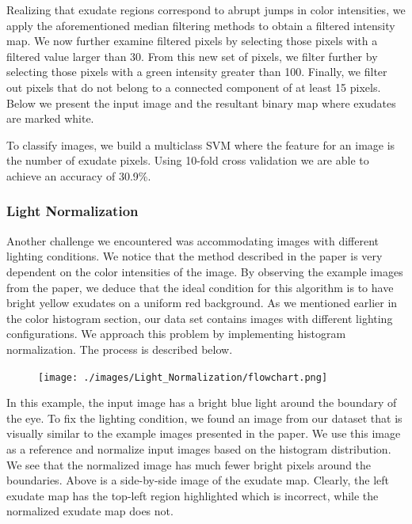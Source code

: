 \documentclass{article} %
\begin{document}
Realizing that exudate regions correspond to abrupt jumps in color intensities, we apply the aforementioned median filtering methods to obtain a filtered intensity map. We now further examine filtered pixels by selecting those pixels with a filtered value larger than 30. From this new set of pixels, we filter further by selecting those pixels with a green intensity greater than 100. Finally, we filter out pixels that do not belong to a connected component of at least 15 pixels. Below we present the input image and the resultant binary map where exudates are marked white.

\begin{figure}[htp]
  \centering
  \quad
\end{figure}

To classify images, we build a multiclass SVM where the feature for an image is the number of exudate pixels. Using 10-fold cross validation we are able to achieve an accuracy of 30.9\%.

\subsubsection{Light Normalization}
Another challenge we encountered was accommodating images with different lighting conditions. We notice that the method described in the paper is very dependent on the color intensities of the image. By observing the example images from the paper, we deduce that the ideal condition for this algorithm is to have bright yellow exudates on a uniform red background. As we mentioned earlier in the color histogram section, our data set contains images with different lighting configurations. We approach this problem by implementing histogram normalization. The process is described below.
\begin{figure}[H]
    \centerline{\texttt{[image: ./images/Light\_Normalization/flowchart.png]}}
\end{figure}
In this example, the input image has a bright blue light around the boundary of the eye. To fix the lighting condition, we found an image from our dataset that is visually similar to the example images presented in the paper. We use this image as a reference and normalize input images based on the histogram distribution. We see that the normalized image has much fewer bright pixels around the boundaries. Above is a side-by-side image of the exudate map. Clearly, the left exudate map has the top-left region highlighted which is incorrect, while the normalized exudate map does not.
\end{document}
